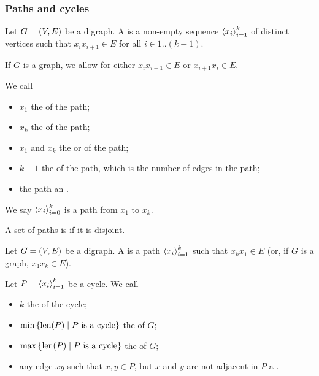 \subsubsection{Paths and cycles}
\begin{definition}
Let $G = \left( V,E \right)$ be a digraph. A  is a non-empty sequence $\left\langle x_i \right\rangle_{i=1}^k$ of distinct vertices such that $x_{i}x_{i+1} \in E$ for all $i\in 1..(k-1)$.

If $G$ is a graph, we allow for either $x_{i}x_{i+1} \in E$ or $x_{i+1}x_{i} \in E$.

We call
\begin{itemize}
    \item $x_1$ the  of the path;
    \item $x_k$ the  of the path;
    \item $x_1$ and $x_k$ the  or  of the path;
    \item $k - 1$ the  of the path, which is the number of edges in the path;
    \item the path an .
\end{itemize}

We say $\left\langle x_i \right\rangle_{i=0}^k$ is a path from $x_1$ to $x_k$.

A set of paths is  if it is disjoint.
\end{definition}

\begin{definition}
Let $G = \left( V,E \right)$ be a digraph. A  is a path $\left\langle x_i \right\rangle_{i=1}^k$ such that $x_kx_1 \in E$ (or, if $G$ is a graph, $x_1x_k\in E$).

Let $P = \left\langle x_i \right\rangle_{i=1}^k$ be a cycle. We call
\begin{itemize}
\item $k$ the  of the cycle;
\item $\min\setbuilder{\len(P)}{\text{$P$ is a cycle}}$ the  of $G$;
\item $\max\setbuilder{\len(P)}{\text{$P$ is a cycle}}$ the  of $G$;
\item any edge $xy$ such that $x,y\in P$, but $x$ and $y$ are not adjacent in $P$ a .
\end{itemize}
\end{definition}


